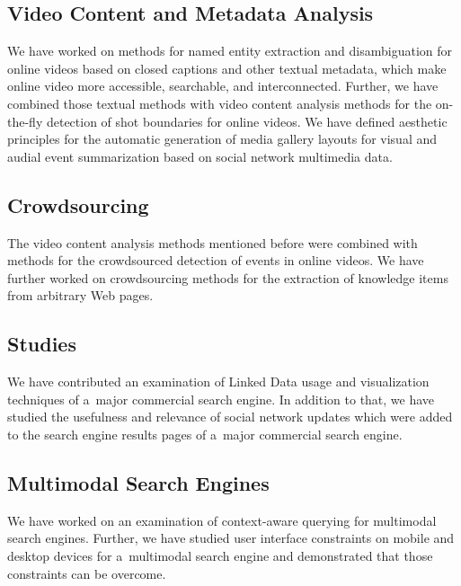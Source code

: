 \subsection{Video Content and Metadata Analysis}

We have worked on methods for named entity extraction and
disambiguation for online videos based on closed captions
and other textual metadata, which make online video
more accessible, searchable, and interconnected.
Further, we have combined those textual methods with 
video content analysis methods for the on-the-fly detection
of shot boundaries for online videos.
We have defined aesthetic principles
for the automatic generation of media gallery layouts
for visual and audial event summarization
based on social network multimedia data.
        
\subsection{Crowdsourcing}

The video content analysis methods mentioned before
were combined with methods for the crowdsourced detection
of events in online videos.
We have further worked on crowdsourcing methods
for the extraction of knowledge items from arbitrary Web pages.

\subsection{Studies}

We have contributed an examination of Linked Data usage and
visualization techniques of a~major commercial search engine.
In addition to that, we have studied the usefulness and relevance
of social network updates which were added to the search engine
results pages of a~major commercial search engine.

\subsection{Multimodal Search Engines}

We have worked on an examination of context-aware querying
for multimodal search engines.
Further, we have studied user interface constraints on
mobile and desktop devices for a~multimodal search engine
and demonstrated that those constraints can be overcome.

